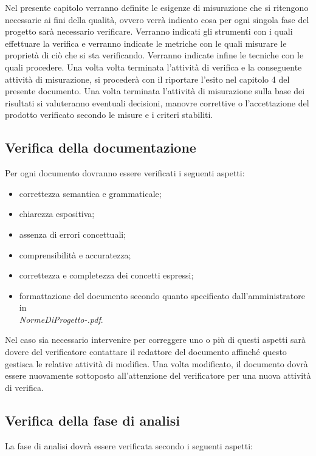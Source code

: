 Nel presente capitolo verranno definite le esigenze di misurazione che si
ritengono necessarie ai fini della qualit\`a, ovvero verr\`a indicato cosa per ogni
singola fase del progetto sar\`a necessario verificare. Verranno indicati gli
strumenti con i quali effettuare la verifica e verranno indicate le metriche con
le quali misurare le propriet\`a di ci\`o che si sta verificando. Verranno indicate
infine le tecniche con le quali procedere. Una volta volta terminata l'attivit\`a
di verifica e la conseguente attivit\`a di misurazione, si proceder\`a con il
riportare l'esito nel capitolo 4 del presente documento. Una volta terminata
l'attivit\`a di misurazione sulla base dei risultati si valuteranno eventuali
decisioni, manovre correttive o l'accettazione del prodotto verificato secondo
le misure e i criteri stabiliti.


\subsection{Verifica della documentazione}

Per ogni documento dovranno essere verificati i seguenti aspetti:
\begin{itemize}
\item correttezza semantica e grammaticale;
\item chiarezza espositiva;
\item assenza di errori concettuali;
\item comprensibilit\`a e accuratezza;
\item correttezza e completezza dei concetti espressi;
\item formattazione del documento secondo quanto specificato dall'amministratore
in\\ \emph{NormeDiProgetto-\versionenormeprogetto.pdf}.
\end{itemize}

Nel caso sia necessario intervenire per correggere uno o pi\`u di questi aspetti
sar\`a dovere del verificatore contattare il redattore del documento affinch\'e
questo gestisca le relative attivit\`a di modifica. Una volta modificato, il
documento dovr\`a essere nuovamente sottoposto all'attenzione del verificatore
per una nuova attivit\`a di verifica.


\subsection{Verifica della fase di analisi}

La fase di analisi dovr\`a essere verificata secondo i seguenti aspetti:

